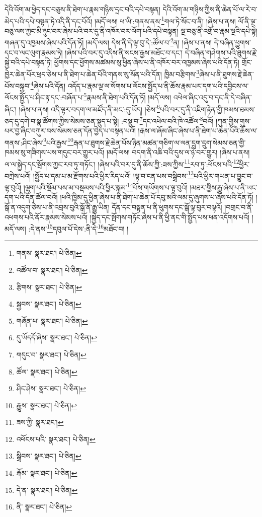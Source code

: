དེའི་འོག་མ་ཕྱེད་དང་བཅུས་ནི་ཐེག་པ་རྣམ་གཉིས་དྲང་བའི་དཔེ་བསྟན། དེའི་འོག་མ་གཉིས་ཀྱིས་ནི་ཆེན་པོ་ལ་རེ་བ་མེད་པའི་དཔེ་བསྟན་ཏེ་འདི་ནི་དང་པོའོ། །མདོ་ལས། ཕ་ཡི་:གནས་ནས་\footnote{གནས་  སྣར་ཐང་།  པེ་ཅིན། }གལ་ཏེ་སོང་བ་ནི། །ཞེས་པ་ནས། ལོ་ནི་ལྔ་བཅུ་ལས་ཀྱང་མི་ཉུང་བར་ཞེས་པའི་བར་དུ་ནི་འཁོར་བར་ལོག་པའི་དཔེ་བསྟན། ལྔ་བཅུ་ནི་འགྲོ་བ་རྣམ་ལྔའི་དཔེ་སྟེ། གཞན་དུ་འཁྱམས་ཞེས་པའི་དོན་ཏོ། །མདོ་ལས། དེས་ནི་དེ་ལྟ་བུ་དེ་:ཚོལ་བ་\footnote{འཚོལ་བ་  སྣར་ཐང་།  པེ་ཅིན། }ན། །ཞེས་པ་ནས། དེ་བཞིན་ཕྱུགས་དང་བ་ལང་ལུག་རྣམས་ཏེ། །ཞེས་པའི་བར་དུ་འདིས་ནི་སངས་རྒྱས་མཐོང་བ་དང་། དེ་བཞིན་གཤེགས་པའི་ཐུགས་རྗེ་སྐྱེ་བའི་དཔེ་བསྟན་ཏེ། ཕྱོགས་དང་ཕྱོགས་མཚམས་སུ་ཕྱིན་ཞེས་པ་ནི་འཁོར་བར་འཁྱམས་ཞེས་པའི་དོན་ཏེ། གྲོང་ཁྱེར་ཆེན་པོར་ཕྲད་ཅེས་པ་ནི་ཐེག་པ་ཆེན་པོའི་གནས་སུ་སོན་པའི་དོན། ཁྱིམ་བརྩིགས་\footnote{རྩིགས་  སྣར་ཐང་།  པེ་ཅིན། }ཞེས་པ་ནི་ཐུགས་རྗེ་ཆེན་པོས་བསྐྱབ་\footnote{སྐྱབས་  སྣར་ཐང་།  པེ་ཅིན། }ཞེས་པའི་དོན། འདོད་པ་རྣམ་ལྔ་ལ་སོགས་པ་ལོངས་སྤྱོད་པ་ནི་ཆོས་རྣམ་པར་དག་པའི་དབྱིངས་ལ་ལོངས་སྤྱོད་པ་ཤིང་རྟ་དང་:བཞོན་པ་\footnote{གཞོན་པ་  སྣར་ཐང་།  པེ་ཅིན། }རྣམས་ནི་ཐེག་པའི་དོན་ཏོ། །མདོ་ལས། འཕེལ་ཞིང་འདུ་བ་དང་ནི་དེ་བཞིན་ཞིང་། །ཞེས་པ་ནས། འདི་ལྟར་བདག་ལ་མཛོད་ནི་མང་:དུ་ཡོད། །ཅེས་\footnote{དུ་ཡོདདོ་ཞེས་  སྣར་ཐང་།  པེ་ཅིན། }པའི་བར་དུ་ནི་འཇིག་རྟེན་གྱི་ཁམས་ཐམས་ཅད་དུ་དགེ་བ་སྣ་ཚོགས་ཀྱིས་སེམས་ཅན་སྡུད་པ་སྟེ། :བསྡུ་བ་\footnote{གདུང་བ་  སྣར་ཐང་།  པེ་ཅིན། }དང་འཕེལ་བའི་ཁེ་འཚོལ་\footnote{ཚོལ་  སྣར་ཐང་།  པེ་ཅིན། }བའོ། །ཀུན་གྱིས་གུས་པར་བྱ་ཞིང་བཀུར་བས་སེམས་ཅན་དོན་བྱེད་པ་བསྟན་པའོ། །རྒས་ལ་ཞོམ་ཞིང་ཞེས་པ་ནི་ཐེག་པ་ཆེན་པོའི་ཆོས་ལ་གནས་:ཤིང་ཞེས་\footnote{ཤིང་ཤེས་  སྣར་ཐང་།  པེ་ཅིན། }པའི་རྒྱས་\footnote{རྒྱུས་  སྣར་ཐང་།  པེ་ཅིན། }རྒན་པ་ཐུགས་རྗེ་ཆེན་པོས་ཉིན་མཚན་གཅིག་ལ་ལན་དྲུག་དྲུག་སེམས་ཅན་གྱི་ཁམས་སུ་གཟིགས་པས་གདུང་བར་གྱུར་པའོ། །མདོ་ལས། བདག་ནི་འཆི་བའི་དུས་ལ་ཉེ་བར་གྱུར། །ཞེས་པ་ནས། ལ་ལ་སྐྱེད་དང་སྦོགས་ཀྱང་རབ་ཏུ་གཏོང་། །ཞེས་པའི་བར་དུ་ནི་ཆོས་ཀྱི་:ཟས་ཀྱིས་\footnote{ཟས་ཀྱི་  སྣར་ཐང་། }རབ་ཏུ་:ཕོངས་པའི་\footnote{འཕོངས་པའི་  སྣར་ཐང་།  པེ་ཅིན། }ཕྱིར་བཀྲེས་པའོ། །སྤྱོད་པ་དམ་པ་མ་རྫོགས་པའི་ཕྱིར་རིད་པའོ། །ལྟ་བ་ངན་པས་བསྒྲིབས་\footnote{སྒྲིབས་  སྣར་ཐང་།  པེ་ཅིན། }པའི་ཕྱིར་གཡན་པ་བྱུང་བ་ལྟ་བུའོ། །ལྷག་པའི་སྡོམ་པས་མ་བསྡམས་པའི་ཕྱིར་སྐམ་\footnote{རྐོམ་  སྣར་ཐང་།  པེ་ཅིན། }པོས་གཡོགས་པ་ལྟ་བུའོ། །མཐར་གྱིས་རྒྱུ་ཞེས་པ་ནི་ཡང་དག་པའི་དོན་ཚོལ་བའོ། །ཕའི་ཁྱིམ་དུ་ཕྱིན་ཞེས་པ་ནི་ཐེག་པ་ཆེན་པོ་དབུ་མའི་ལམ་དུ་ཞུགས་པ་ཞེས་པའི་དོན་ཏོ། །སྒོ་ན་འདུག་ཅེས་པ་ནི་འབྲས་བུའི་སྒོ་ནི་རྒྱུ་ཡིན། དོན་དང་བསྟན་པ་ནི་ཕུགས་དང་སྒོ་ལྟ་བུར་བལྟའོ། །བགྲང་བ་ནི་འཕགས་པའི་ནོར་རྣམས་སེམས་པའོ། །སྐྱེད་དང་སྤོགས་གཏོང་ཞེས་པ་ནི་ཕྱི་ནང་གི་སྤྱོད་པས་ཕན་འདོགས་པའོ། །མདོ་ལས། :དེ་ནས་\footnote{དེ་ན་  སྣར་ཐང་།  པེ་ཅིན། }དབུལ་པོ་དེས་:ནི་དེ་\footnote{ནི་  སྣར་ཐང་།  པེ་ཅིན། }མཐོང་བ། །

